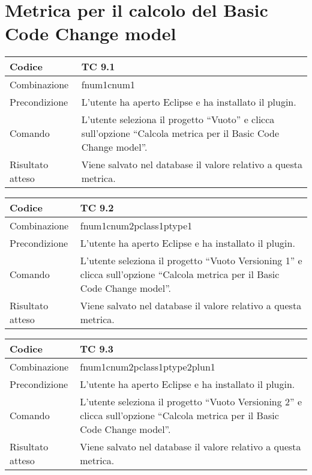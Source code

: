 \clearpage

\section{Metrica per il calcolo del Basic Code Change model}

\begin{table}[ht]
\begin{tabular}{|p{3cm}|p{9cm}|}
\hline
\cellcolor{lightgray}Codice				& TC 9.1								\\
\hline
\cellcolor{lightgray}Combinazione		& fnum1cnum1									\\
\hline
\cellcolor{lightgray}Precondizione		& L'utente ha aperto Eclipse e ha installato il plugin.		\\
\hline
\cellcolor{lightgray}Comando			& L'utente seleziona il progetto ``Vuoto''  e clicca sull'opzione ``Calcola metrica per il Basic Code Change model''.	\\
\hline
\cellcolor{lightgray}Risultato atteso	& Viene salvato nel database il valore relativo a questa metrica.\\
\hline
\end{tabular}
\end{table}


\begin{table}[ht]
\begin{tabular}{|p{3cm}|p{9cm}|}
\hline
\cellcolor{lightgray}Codice				& TC 9.2								\\
\hline
\cellcolor{lightgray}Combinazione		& fnum1cnum2pclass1ptype1									\\
\hline
\cellcolor{lightgray}Precondizione		& L'utente ha aperto Eclipse e ha installato il plugin.		\\
\hline
\cellcolor{lightgray}Comando			& L'utente seleziona il progetto ``Vuoto Versioning 1''  e clicca sull'opzione ``Calcola metrica per il Basic Code Change model''.	\\
\hline
\cellcolor{lightgray}Risultato atteso	& Viene salvato nel database il valore relativo a questa metrica.\\
\hline
\end{tabular}
\end{table}


\begin{table}[ht]
\begin{tabular}{|p{3cm}|p{9cm}|}
\hline
\cellcolor{lightgray}Codice				& TC 9.3								\\
\hline
\cellcolor{lightgray}Combinazione		& fnum1cnum2pclass1ptype2plun1									\\
\hline
\cellcolor{lightgray}Precondizione		& L'utente ha aperto Eclipse e ha installato il plugin.		\\
\hline
\cellcolor{lightgray}Comando			& L'utente seleziona il progetto ``Vuoto Versioning 2''  e clicca sull'opzione ``Calcola metrica per il Basic Code Change model''.	\\
\hline
\cellcolor{lightgray}Risultato atteso	& Viene salvato nel database il valore relativo a questa metrica.\\
\hline
\end{tabular}
\end{table}



